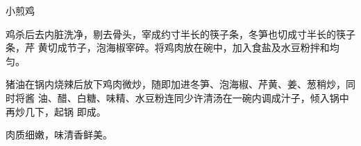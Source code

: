 \begin{recipe}{小煎鸡}

\ingredients


\preparation

鸡杀后去内脏洗净，剔去骨头，宰成约寸半长的筷子条，冬笋也切成寸半长的筷子条，芹
黄切成节子，泡海椒宰碎。将鸡肉放在碗中，加入食盐及水豆粉拌和均匀。

猪油在锅内烧辣后放下鸡肉微炒，随即加进冬笋、泡海椒、芹黄、姜、葱稍炒，同时将酱
油、醋、白糖、味精、水豆粉连同少许清汤在一碗内调成汁子，倾入锅中再炒几下，起锅
即成。

\features

肉质细嫩，味清香鲜美。

\end{recipe}

